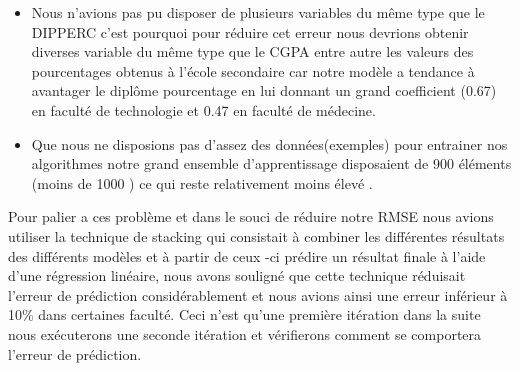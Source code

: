 \begin{itemize}
	\item Nous n'avions pas pu disposer de plusieurs variables du même type que le DIPPERC  c'est pourquoi pour réduire cet erreur nous devrions obtenir diverses variable du même type que le CGPA entre autre les valeurs des pourcentages obtenus à l'école secondaire car notre modèle a tendance à avantager le diplôme pourcentage en lui donnant un grand coefficient (0.67) en faculté de technologie et 0.47 en faculté de médecine. 
	\item Que nous ne disposions pas d'assez des données(exemples) pour entrainer nos algorithmes notre grand ensemble d'apprentissage disposaient de 900 éléments (moins de 1000 ) ce qui reste relativement  moins élevé   .
\end{itemize}

Pour palier a ces problème et dans le souci de réduire notre \ac{RMSE} nous avions utiliser la technique de stacking qui consistait à combiner les différentes résultats des différents modèles et à partir de ceux -ci prédire un résultat finale à l'aide d'une régression linéaire, nous avons souligné que cette technique réduisait l'erreur de prédiction considérablement et nous avions ainsi une erreur inférieur à 10\% dans certaines faculté.
 Ceci n'est qu'une première itération dans la suite nous exécuterons une seconde itération et vérifierons comment se comportera l'erreur de prédiction.   

